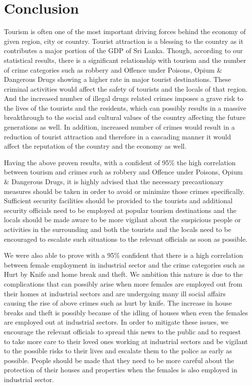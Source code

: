 \documentclass[conference]{IEEEtran}
\begin{document}
\section{Conclusion}
Tourism is often one of the most important driving forces behind the economy of given region, city or country. Tourist attraction is a blessing to the country as it contributes a major portion of the GDP of Sri Lanka. Though, according to our statistical results, there is a significant relationship with tourism and the number of crime categories such as robbery and Offence under Poisons, Opium & Dangerous Drugs showing a higher rate in major tourist destinations. These criminal activities would affect the safety of tourists and the locals of that region. And the increased number of illegal drugs related crimes imposes a grave risk to the lives of the tourists and the residents, which can possibly results in a massive breakthrough to the social and cultural values of the country affecting the future generations as well. In addition, increased number of crimes would result in a reduction of tourist attraction and therefore in a cascading manner it would affect the reputation of the country and the economy as well.\par
Having the above proven results, with a confident of 95\% the high correlation between tourism and crimes such as robbery and Offence under Poisons, Opium & Dangerous Drugs, it is highly advised that the necessary precautionary measures should be taken in order to avoid or minimize those crimes specifically. Sufficient security facilities should be provided to the tourists and additional security officials need to be employed at popular tourism destinations and the locals should be made aware to be more vigilant about the suspicious people or activities in the surrounding and both the tourists and the locals need to be encouraged to escalate such situations to the relevant officials as soon as possible. \par
We were also able to prove with a 95\% confident that there is a high correlation between  female employment in industrial sector and the crime categories such as Hurt by Knife and home break and theft. We ambition this nature is due to the complications that can possibly arise when more females are employed out from their homes at industrial sectors and are undergoing many ill social affairs causing the rise of above crimes such as hurt by knife. The increase in house breaks and theft is possibly because of the idling of houses when even the females are employed out at industrial sectors. In order to mitigate these issues, we encourage the relevant officials to spread this news to the public and to request to take more care to their loved ones working at industrial sectors and be vigilant to the possible risks to their lives and escalate them to the police as early as possible. People should be made that they need to be more careful about the protection of their houses and properties when the females is also employed in industrial sector.
 
\end{document}
